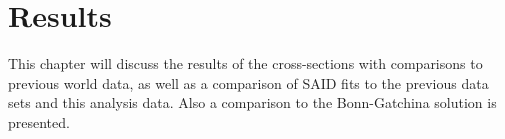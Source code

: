 \chapter{Results}\label{sec:results}

This chapter will discuss the results of the cross-sections with comparisons to previous world data, as well as a comparison of SAID fits to the previous data sets and this analysis data. Also a comparison to the Bonn-Gatchina solution is presented.

 
 
 
 
 